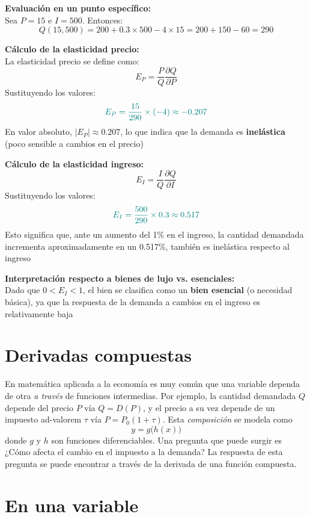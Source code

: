 \documentclass{article}
\begin{document}
\textbf{Evaluación en un punto específico:}\\
Sea \(P = 15\) e \(I = 500\). Entonces:
\[
Q(15, 500) = 200 + 0.3 \times 500 - 4 \times 15 = 200 + 150 - 60 = 290
\]

\textbf{Cálculo de la elasticidad precio:}\\
La elasticidad precio se define como:
\[
E_P = \frac{P}{Q}\frac{\partial Q}{\partial P}
\]
Sustituyendo los valores:
\[
\color{teal}
E_P = \frac{15}{290} \times (-4) \approx -0.207
\]
En valor absoluto, \(\left|E_P\right| \approx 0.207\), lo que indica que la demanda es \textbf{inelástica} (poco sensible a cambios en el precio)

\textbf{Cálculo de la elasticidad ingreso:}
\[
E_I = \frac{I}{Q}\frac{\partial Q}{\partial I}
\]
Sustituyendo los valores:
\[
\color{teal}
E_I = \frac{500}{290} \times 0.3 \approx 0.517
\]
Esto significa que, ante un aumento del 1\% en el ingreso, la cantidad demandada incrementa aproximadamente en un 0.517\%, también es inelástica respecto al ingreso

\textbf{Interpretación respecto a bienes de lujo vs. esenciales:}\\
Dado que \(0 < E_I < 1\), el bien se clasifica como un \textbf{\color{teal}bien esencial} (o necesidad básica), ya que la respuesta de la demanda a cambios en el ingreso es relativamente baja








\newpage

\section{Derivadas compuestas}





En matemática aplicada a la economía es muy común que una variable dependa de otra \emph{a través} de funciones intermedias. Por ejemplo, la cantidad demandada \(Q\) depende del precio \(P\) vía \(Q = D(P)\), y el precio a su vez depende de un impuesto ad-valorem \(\tau\) vía \(P = P_0(1+\tau)\). Esta \emph{composición} se modela como
\[
y = g\big(h(x)\big)
\]
donde \(g\) y \(h\) son funciones diferenciables. Una pregunta que puede surgir es ¿Cómo afecta el cambio en el impuesto a la demanda? La respuesta de esta pregunta se puede encontrar a través de la derivada de una función compuesta.

\section*{En una variable}
\end{document}
